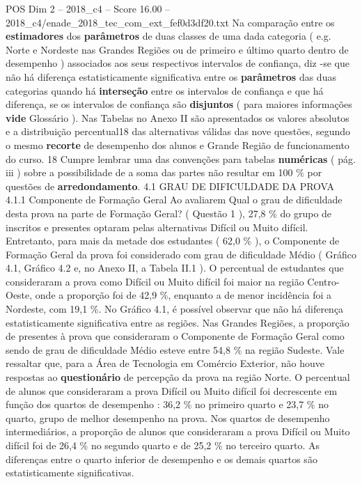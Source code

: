 \begin{textsample}{POS Dim 2 – 2018\_c4 – Score 16.00 – 2018\_c4/enade\_2018\_tec\_com\_ext\_fef0d3df20.txt}
Na comparação entre os \textbf{estimadores} dos \textbf{parâmetros} de duas classes de uma dada categoria ( e.g.
Norte e Nordeste nas Grandes Regiões ou de primeiro e último quarto dentro de desempenho ) associados aos seus respectivos intervalos de confiança, diz -se que não há diferença estatisticamente significativa entre os \textbf{parâmetros} das duas categorias quando há \textbf{interseção} entre os intervalos de confiança e que há diferença, se os intervalos de confiança são \textbf{disjuntos} ( para maiores informações \textbf{vide} Glossário ).
Nas Tabelas no Anexo II são apresentados os valores absolutos e a distribuição percentual18 das alternativas válidas das nove questões, segundo o mesmo \textbf{recorte} de desempenho dos alunos e Grande Região de funcionamento do curso. 18 Cumpre lembrar uma das convenções para tabelas \textbf{numéricas} ( pág. iii ) sobre a possibilidade de a soma das partes não resultar em 100 \% por questões de \textbf{arredondamento}. 4.1 GRAU DE DIFICULDADE DA PROVA 4.1.1 Componente de Formação Geral Ao avaliarem Qual o grau de dificuldade desta prova na parte de Formação Geral? ( Questão 1 ), 27,8 \% do grupo de inscritos e presentes optaram pelas alternativas Difícil ou Muito difícil.
Entretanto, para mais da metade dos estudantes ( 62,0 \% ), o Componente de Formação Geral da prova foi considerado com grau de dificuldade Médio ( Gráfico 4.1, Gráfico 4.2 e, no Anexo II, a Tabela II.1 ).
O percentual de estudantes que consideraram a prova como Difícil ou Muito difícil foi maior na região Centro-Oeste, onde a proporção foi de 42,9 \%, enquanto a de menor incidência foi a Nordeste, com 19,1 \%.
No Gráfico 4.1, é possível observar que não há diferença estatisticamente significativa entre as regiões.
Nas Grandes Regiões, a proporção de presentes à prova que consideraram o Componente de Formação Geral como sendo de grau de dificuldade Médio esteve entre 54,8 \% na região Sudeste.
Vale ressaltar que, para a Área de Tecnologia em Comércio Exterior, não houve respostas ao \textbf{questionário} de percepção da prova na região Norte.
O percentual de alunos que consideraram a prova Difícil ou Muito difícil foi decrescente em função dos quartos de desempenho : 36,2 \% no primeiro quarto e 23,7 \% no quarto, grupo de melhor desempenho na prova.
Nos quartos de desempenho intermediários, a proporção de alunos que consideraram a prova Difícil ou Muito difícil foi de 26,4 \% no segundo quarto e de 25,2 \% no terceiro quarto.
As diferenças entre o quarto inferior de desempenho e os demais quartos são estatisticamente significativas.

\end{textsample}
